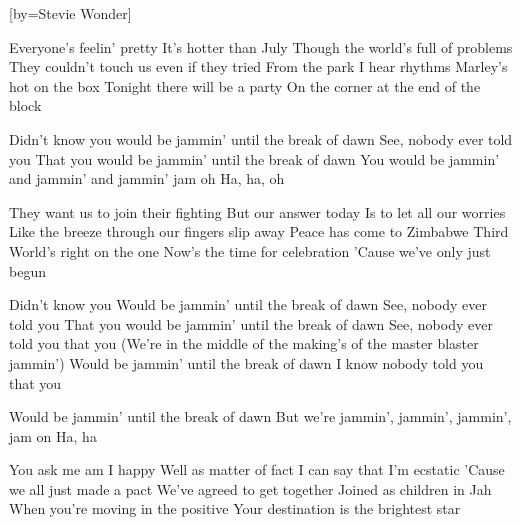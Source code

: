 [by={Stevie Wonder}]

  \beginverse
  Everyone's feelin' pretty
  It's hotter than July
  Though the world's full of problems
  They couldn't touch us even if they tried
  From the park I hear rhythms
  Marley's hot on the box
  Tonight there will be a party
  On the corner at the end of the block
  \endverse

  \beginverse
  Didn't know you would be jammin' until the break of dawn
  See, nobody ever told you
  That you would be jammin' until the break of dawn
  You would be jammin' and jammin' and jammin' jam oh
  Ha, ha, oh
  \endverse

  \beginverse
  They want us to join their fighting
  But our answer today
  Is to let all our worries
  Like the breeze through our fingers slip away
  Peace has come to Zimbabwe
  Third World's right on the one
  Now's the time for celebration
  'Cause we've only just begun
  \endverse

  \beginverse
  Didn't know you
  Would be jammin' until the break of dawn
  See, nobody ever told you
  That you would be jammin' until the break of dawn
  See, nobody ever told you that you
  (We're in the middle of the making's of the master blaster jammin')
  Would be jammin' until the break of dawn
  I know nobody told you that you
  \endverse

  \beginverse
  Would be jammin' until the break of dawn
  But we're jammin', jammin', jammin', jam on
  Ha, ha
  \endverse

  \beginverse
  You ask me am I happy
  Well as matter of fact
  I can say that I'm ecstatic
  'Cause we all just made a pact
  We've agreed to get together
  Joined as children in Jah
  When you're moving in the positive
  Your destination is the brightest star
  \endverse
  
\endsong
